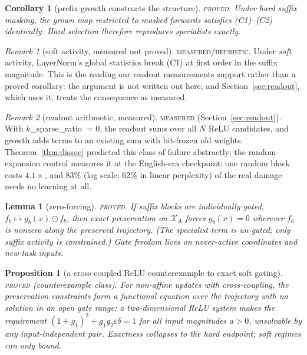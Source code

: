 \documentclass[11pt]{article}
\newtheorem{lemma}{Lemma}
\newtheorem{proposition}{Proposition}
\newtheorem{corollary}{Corollary}
\theoremstyle{definition}\newtheorem{definition}{Definition}
\theoremstyle{remark}\newtheorem{remark}{Remark}
\begin{document}
\begin{corollary}[prefix growth constructs the structure]\label{cor:prefix}
\textsc{proved.} Under hard suffix masking, the grown map restricted to masked forwards
satisfies (C1)--(C2) identically. Hard selection therefore reproduces specialists exactly.
\end{corollary}

\begin{remark}[soft activity, measured not proved]\label{rem:softln}
\textsc{measured/heuristic.} Under \emph{soft} activity, LayerNorm's global statistics
break (C1) at first order in the suffix magnitude. This is the reading our readout
measurements support rather than a proved corollary: the argument is not written out here,
and Section~\ref{sec:readout}, which uses it, treats the consequence as measured.
\end{remark}

\begin{remark}[readout arithmetic, measured]\label{rem:readout}
\textsc{measured} (Section~\ref{sec:readout}). With $k$\_sparse\_ratio $=0$, the readout
sums over all $N$ ReLU candidates, and growth adds terms to an existing sum with bit-frozen
old weights. Theorem~\ref{thm:dissoc} predicted this class of failure abstractly; the
random-expansion control measures it at the English-era checkpoint: one random block costs $4.1\times$, and 83\% (log scale; 62\% in linear perplexity) of the
real damage needs no learning at all.
\end{remark}

\begin{lemma}[zero-forcing]\label{lem:zf}
\textsc{proved.} If suffix blocks are individually gated, $f_b\mapsto g_b(x)\odot f_b$, then
exact preservation on $\mathcal{X}_A$ forces $g_b(x)=0$ wherever $f_b$ is nonzero along the
preserved trajectory. (The specialist term is un-gated; only suffix activity is constrained.)
Gate freedom lives on never-active coordinates and new-task inputs.
\end{lemma}

\begin{proposition}[a cross-coupled ReLU counterexample to exact soft gating]\label{prop:soft}
\textsc{proved} (counterexample class). For non-affine updates with cross-coupling, the
preservation constraints form a functional equation over the trajectory with no solution in
an open gate range: a two-dimensional ReLU system makes the requirement
$(1{+}g_1)^2+g_1g_2\varepsilon\delta=1$ for all input magnitudes $a>0$, unsolvable by any
input-independent pair. Exactness collapses to the hard endpoint; soft regimes can only
bound.
\end{proposition}
\end{document}
